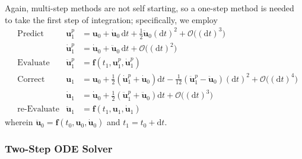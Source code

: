 Again, multi-step methods are not self starting, so a one-step method is needed to take the first step of integration; specifically, we employ
\begin{subequations}
    \label{pairedStartUp}
    \begin{align}
    \mbox{} & \text{Predict} & 
    \mathbf{u}_1^p & = \mathbf{u}_0 + \dot{\mathbf{u}}_0 \, \mathrm{d}t +
    \tfrac{1}{2} \ddot{\mathbf{u}}_0 (\mathrm{d}t)^2 + \mathcal{O} \bigl( ( \mathrm{d}t )^3 \bigr)
    \label{startupDisplacementPredictor} \\
    \mbox{} & &
    \dot{\mathbf{u}}^p_1 & = 
    \dot{\mathbf{u}}_0 + \ddot{\mathbf{u}}_0 \, \mathrm{d}t + 
    \mathcal{O} \bigl( ( \mathrm{d}t )^2 \bigr) 
    \label{startUpVelocityPredictor} \\
    \mbox{} & \text{Evaluate} &
    \ddot{\mathbf{u}}^p_1 & = \mathbf{f} (t_1, \mathbf{u}^p_1, \dot{\mathbf{u}}^p_1)
    \label{startUpEvaluate} \\
    \mbox{} & \text{Correct} &
    \mathbf{u}_1 & = \mathbf{u}_0 + \tfrac{1}{2} 
    ( \dot{\mathbf{u}}^p_1 + \dot{\mathbf{u}}_0 ) \mathrm{d}t -
    \tfrac{1}{12} ( \ddot{\mathbf{u}}^p_1 - 
    \ddot{\mathbf{u}}_0 ) (\mathrm{d}t)^2 + \mathcal{O} \bigl( (\mathrm{d}t)^4 \bigr) 
    \label{startupDisplacementCorrector} \\
    \mbox{} & &
    \dot{\mathbf{u}}_1 & = \dot{\mathbf{u}}_0 + \tfrac{1}{2} 
    ( \ddot{\mathbf{u}}_1^p + \ddot{\mathbf{u}}_0 ) \mathrm{d}t + 
    \mathcal{O} \bigl( (\mathrm{d}t)^3 \bigr)
    \label{startUpVelocityCorrector} \\
    \mbox{} & \text{re-Evaluate} &
    \ddot{\mathbf{u}}_1 & = \mathbf{f} (t_1, \mathbf{u}_1, \dot{\mathbf{u}}_1) 
    \label{startUpReEvaluate}
    \end{align}
\end{subequations}
wherein $\ddot{\mathbf{u}}_0 = \mathbf{f}(t_0, \mathbf{u}_0, \dot{\mathbf{u}}_0)$ and $t_1 = t_0 + \mathrm{d}t$. 


\subsubsection{Two-Step ODE Solver}

